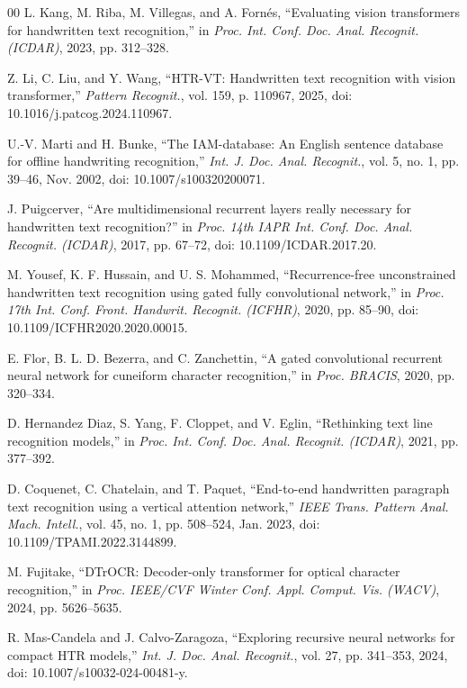 \documentclass{IEEEtran}
\begin{document}
\begin{thebibliography}{00}
 L. Kang, M. Riba, M. Villegas, and A. Forn{\'e}s, ``Evaluating vision transformers for handwritten text recognition,'' in \emph{Proc. Int. Conf. Doc. Anal. Recognit. (ICDAR)}, 2023, pp. 312--328.

 Z. Li, C. Liu, and Y. Wang, ``HTR-VT: Handwritten text recognition with vision transformer,'' \emph{Pattern Recognit.}, vol. 159, p. 110967, 2025, doi: 10.1016/j.patcog.2024.110967.

 U.-V. Marti and H. Bunke, ``The IAM-database: An English sentence database for offline handwriting recognition,'' \emph{Int. J. Doc. Anal. Recognit.}, vol. 5, no. 1, pp. 39--46, Nov. 2002, doi: 10.1007/s100320200071.

 J. Puigcerver, ``Are multidimensional recurrent layers really necessary for handwritten text recognition?'' in \emph{Proc. 14th IAPR Int. Conf. Doc. Anal. Recognit. (ICDAR)}, 2017, pp. 67--72, doi: 10.1109/ICDAR.2017.20.

 M. Yousef, K. F. Hussain, and U. S. Mohammed, ``Recurrence-free unconstrained handwritten text recognition using gated fully convolutional network,'' in \emph{Proc. 17th Int. Conf. Front. Handwrit. Recognit. (ICFHR)}, 2020, pp. 85--90, doi: 10.1109/ICFHR2020.2020.00015.

 E. Flor, B. L. D. Bezerra, and C. Zanchettin, ``A gated convolutional recurrent neural network for cuneiform character recognition,'' in \emph{Proc. BRACIS}, 2020, pp. 320--334.

 D. Hernandez Diaz, S. Yang, F. Cloppet, and V. Eglin, ``Rethinking text line recognition models,'' in \emph{Proc. Int. Conf. Doc. Anal. Recognit. (ICDAR)}, 2021, pp. 377--392.

 D. Coquenet, C. Chatelain, and T. Paquet, ``End-to-end handwritten paragraph text recognition using a vertical attention network,'' \emph{IEEE Trans. Pattern Anal. Mach. Intell.}, vol. 45, no. 1, pp. 508--524, Jan. 2023, doi: 10.1109/TPAMI.2022.3144899.

 M. Fujitake, ``DTrOCR: Decoder-only transformer for optical character recognition,'' in \emph{Proc. IEEE/CVF Winter Conf. Appl. Comput. Vis. (WACV)}, 2024, pp. 5626--5635.

 R. Mas-Candela and J. Calvo-Zaragoza, ``Exploring recursive neural networks for compact HTR models,'' \emph{Int. J. Doc. Anal. Recognit.}, vol. 27, pp. 341--353, 2024, doi: 10.1007/s10032-024-00481-y.


\end{thebibliography}
\end{document}
